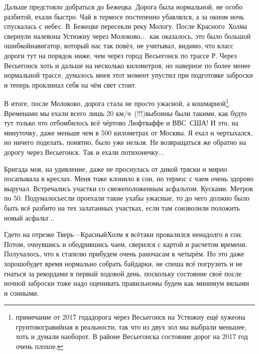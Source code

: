 Дальше предстояло добраться до Бежецка. Дорога была нормальной, не особо разбитой, ехали быстро. Чай в термосе постепенно убавлялся, а за окном ночь спускалась с небес. В~Бежецке пересекли реку Мологу. После Красного~Холма свернули налево\mdash на Устюжну через Молоково$\ldots$~как оказалось, это было большой ошибкой\mdash навигатор, который нас так повёл, не учитывал, видимо, что класс дороги тут на порядок ниже, чем через город Весьегонск по трассе Р. Через Весьегонск хоть и дальше на несколько километров, но наверное по более менее нормальной трассе, думалось мне\mdash я этот момент упустил при подготовке заброски и теперь проклинал себя на чём свет стоит.


В итоге, после Молоково, дорога стала не просто ужасной, а кошмарной\footnote{примечание от 2017 года\mdash дорога через Весьегонск на Устюжну ещё хуже\mdash она грунтово\sdash гравийная в реальности, так что из двух зол мы выбрали меньшее, хоть и думали наоборот. В районе Весьегонска состояние дорог на 2017 год очень плохое.}. Временами мы ехали всего лишь 20\thinspace\nbdash{} км/ч~(!!!)\mdash выбоины были такими, как будто тут только что отбомбилось всё чёртово Люфтваффе и ВВС~США! И это, на минуточку, даже меньше чем в 500 километрах от Москвы. Я ехал и чертыхался, но ничего поделать, понятно, было уже нельзя. Не возвращаться же обратно на дорогу через Весьегонск. Так и ехали потихонечку$\ldots$ 

Бригада моя, на удивление, даже не проснулась от дикой тряски и мирно посапывала в креслах. Меня тоже клонило в сон, но термос с чаем очень здорово выручал. Встречались участки со свежеположенным асфальтом. Кусками. Метров по 50\thinspace\nbdash{}. Подумалось\mdash если проехали такие ухабы ужасные, то до чего должно было быть всё разбито на тех залатанных участках, если там соизволили положить новый асфальт$\ldots$ 
 
Где\sdash то на отрезке Тверь\thinspace\nobreakdash---\thinspace Красный\thinspace Холм я всё\sdash таки провалился ненадолго в сон. Потом, очнувшись и ободрившись чаем, сверился с картой и расчетом времени. Получалось, что к стапелю прибудем очень рано\mdash часам к четырём. Но это даже хорошо\mdash будет время нормально собрать байдарки, не спеша всё погрузить и не гнаться за рекордами в первый ходовой день, поскольку состояние своё после ночной заброски тоже надо оценивать правильно\mdash мы будем как минимум вялыми и сонными. 

